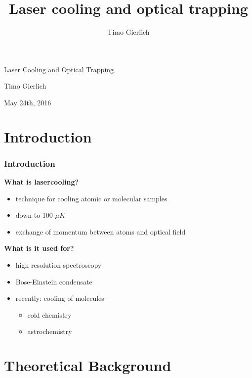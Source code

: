 \documentclass[aspectratio=169]{beamer}
\title{Laser cooling and optical trapping}
\author{Timo Gierlich}
\date{}
\begin{document}
\begin{frame}
  \begin{center}
    {\LARGE Laser Cooling and Optical Trapping}
    
    \bigskip
    
    {\large Timo Gierlich}
        
    \bigskip
   
    {\large May 24th, 2016}
  \end{center}
\end{frame}

\begin{frame}
  \tableofcontents
\end{frame}

\section{Introduction}

\begin{frame}
  \frametitle{Introduction}
  
    \textbf{What is lasercooling?}
    \begin{itemize}
    \item technique for cooling atomic or molecular samples
    \item down to 100 $\mu K$
    \item exchange of momentum between atoms and optical field
    \end{itemize}
    
    \pause  
    \bigskip
    \textbf{What is it used for?}
    \begin{itemize}
      \item high resolution spectroscopy
      \item Bose-Einstein condensate
      \item recently: cooling of molecules
      \begin{itemize}
        \item cold chemistry
        \item astrochemistry
      \end{itemize}
    \end{itemize}
  
\end{frame}

\section{Theoretical Background}
\end{document}
